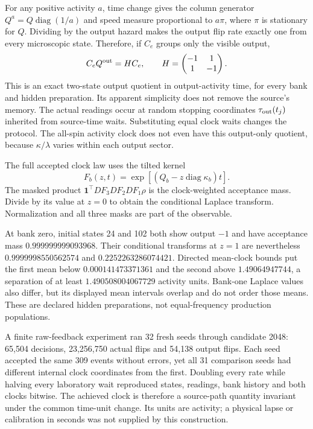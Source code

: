 For any positive activity $a$, time change gives the column generator $Q^a=Q\operatorname{diag}(1/a)$ and speed measure proportional to $a\pi$, where $\pi$ is stationary for $Q$. Dividing by the output hazard makes the output flip rate exactly one from every microscopic state. Therefore, if $C_e$ groups only the visible output,
\[
 C_eQ^{\rm out}=H C_e,
 \qquad
 H=\begin{pmatrix}-1&1\\1&-1\end{pmatrix}.
\]
This is an exact two-state output quotient in output-activity time, for every bank and hidden preparation. Its apparent simplicity does not remove the source's memory. The actual readings occur at random stopping coordinates $\tau_{\rm out}(t_j)$ inherited from source-time waits. Substituting equal clock waits changes the protocol. The all-spin activity clock does not even have this output-only quotient, because $\kappa/\lambda$ varies within each output sector.

The full accepted clock law uses the tilted kernel
\[
 F_b(z,t)=\exp[(Q_b-z\operatorname{diag}\kappa_b)t].
\]
The masked product $\mathbf1^\top D F_3 D F_2 D F_1\rho$ is the clock-weighted acceptance mass. Divide by its value at $z=0$ to obtain the conditional Laplace transform. Normalization and all three masks are part of the observable.

At bank zero, initial states 24 and 102 both show output $-1$ and have acceptance mass $0.999999999093968$. Their conditional transforms at $z=1$ are nevertheless $0.9999998550562574$ and $0.2252263286074421$. Directed mean-clock bounds put the first mean below $0.000141473371361$ and the second above $1.49064947744$, a separation of at least $1.490508004067729$ activity units. Bank-one Laplace values also differ, but its displayed mean intervals overlap and do not order those means. These are declared hidden preparations, not equal-frequency production populations.

A finite raw-feedback experiment ran 32 fresh seeds through candidate 2048: 65,504 decisions, 23,256,750 actual flips and 54,138 output flips. Each seed accepted the same 309 events without errors, yet all 31 comparison seeds had different internal clock coordinates from the first. Doubling every rate while halving every laboratory wait reproduced states, readings, bank history and both clocks bitwise. The achieved clock is therefore a source-path quantity invariant under the common time-unit change. Its units are activity; a physical lapse or calibration in seconds was not supplied by this construction.


